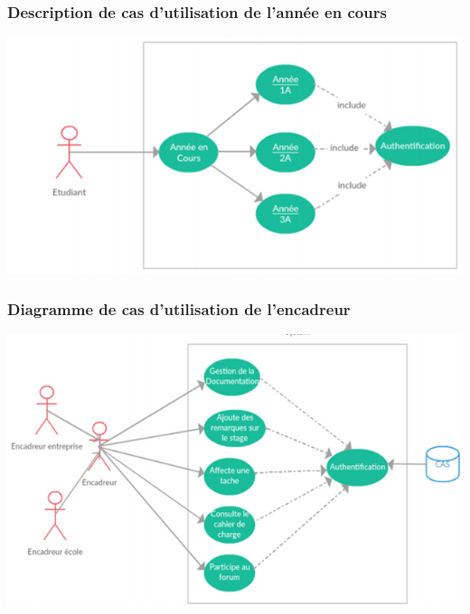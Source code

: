 \documentclass{scrreprt}
\begin{document}
\subsubsection{Description de cas d'utilisation de l'année en cours}
\begin{center}
	\includegraphics[scale=0.55]{image/descriptiondecasanneencours.png}
\end{center}
\subsubsection{Diagramme de cas d'utilisation de l'encadreur}
\begin{center}
	\includegraphics[scale=0.55]{image/casutilisationencadreur.png}
\end{center}
\end{document}
